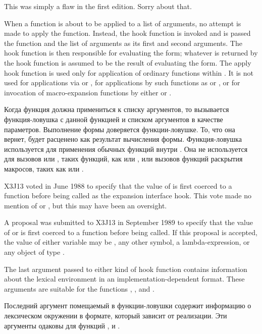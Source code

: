 \begin{defun}[Variable]
\begin{new}
This was simply a flaw in the first edition.  Sorry about that.
\end{new}

When a function is about to be applied to a list of arguments,
no attempt is made to apply the function.
Instead, the hook function is invoked and is passed the function and the list
of arguments
as its first and second arguments.  The hook function is then responsible for
evaluating the form; whatever is returned by the hook function is assumed
to be the result of evaluating the form.
The apply hook function is used only for application of ordinary functions
within .  It is not used for applications via  or
, for applications by such functions as  or
, or for invocation of macro-expansion functions
by either  or .

Когда функция должна примениться к списку аргументов, то вызывается
функция-ловушка с данной функцией и списком аргументов в качестве параметров.
Выполнение формы доверяется функции-ловушке. То, что она вернет, будет расценено
как результат вычисления формы.
Функция-ловушка используется для применения обычных функций внутри
. Она не используется для вызовов  или
, таких функций, как  или , или
вызовов функций раскрытия макросов, таких как  или .
\begin{newer}
X3J13 voted in June 1988  to specify
that the value of  is first coerced to a
function before being called as the expansion interface hook.
This vote made no mention of  or ,
but this may have been an oversight.

A proposal was submitted to X3J13 in September 1989 to specify
that the value of  or  is first coerced to a
function before being called.  If this proposal is accepted,
the value of either variable may be , any other symbol,
a lambda-expression, or any object of type .
\end{newer}

The last argument passed to either kind of hook function contains information
about the lexical environment in an implementation-dependent format.
These arguments are suitable for the functions
, , and .

Последний аргумент помещаемый в функции-ловушки содержит информацию о
лексическом окружении в формате, который зависит от реализации.
Эти аргументы одаковы для функций ,  и
.


\end{defun}
